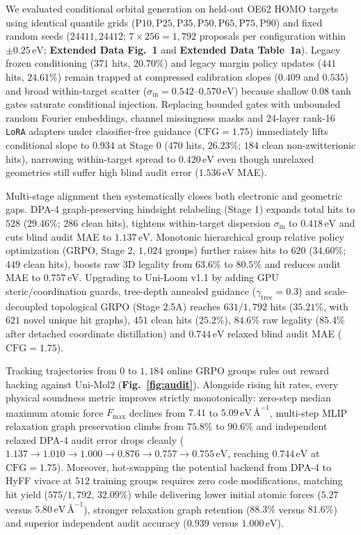\documentclass[11pt,a4paper]{article}
\begin{document}
We evaluated conditional orbital generation on held-out OE62 HOMO targets using identical quantile grids ($\text{P10},\text{P25},\text{P35},\text{P50},\text{P65},\text{P75},\text{P90}$) and fixed random seeds ($24411, 24412$; $7\times 256 = 1{,}792$ proposals per configuration within $\pm 0.25\,\text{eV}$; \textbf{Extended Data Fig.~1} and \textbf{Extended Data Table~1a}). Legacy frozen conditioning ($371$ hits, $20.70\%$) and legacy margin policy updates ($441$ hits, $24.61\%$) remain trapped at compressed calibration slopes ($0.409$ and $0.535$) and broad within-target scatter ($\sigma_{\text{in}}=0.542$--$0.570\,\text{eV}$) because shallow $0.08\tanh$ gates saturate conditional injection. Replacing bounded gates with unbounded random Fourier embeddings, channel missingness masks and 24-layer rank-16 \texttt{LoRA} adapters\cite{hu2022lora} under classifier-free guidance\cite{ho2022cfg} ($\text{CFG}=1.75$) immediately lifts conditional slope to $0.934$ at Stage 0 ($470$ hits, $26.23\%$; $184$ clean non-zwitterionic hits), narrowing within-target spread to $0.420\,\text{eV}$ even though unrelaxed geometries still suffer high blind audit error ($1.536\,\text{eV}$ MAE).

Multi-stage alignment then systematically closes both electronic and geometric gaps. DPA-4 graph-preserving hindsight relabeling (Stage 1) expands total hits to $528$ ($29.46\%$; $286$ clean hits), tightens within-target dispersion $\sigma_{\text{in}}$ to $0.418\,\text{eV}$ and cuts blind audit MAE to $1.137\,\text{eV}$. Monotonic hierarchical group relative policy optimization\cite{shao2024grpo} (GRPO, Stage 2, $1{,}024$ groups) further raises hits to $620$ ($34.60\%$; $449$ clean hits), boosts raw 3D legality from $63.6\%$ to $80.5\%$ and reduces audit MAE to $0.757\,\text{eV}$. Upgrading to Uni-Loom v1.1 by adding GPU steric/coordination guards, tree-depth annealed guidance ($\gamma_{\text{tree}}=0.3$) and scale-decoupled topological GRPO (Stage 2.5A) reaches $631/1{,}792$ hits ($35.21\%$, with $621$ novel unique hit graphs), $451$ clean hits ($25.2\%$), $84.6\%$ raw legality ($85.4\%$ after detached coordinate distillation) and $0.744\,\text{eV}$ relaxed blind audit MAE ($\text{CFG}=1.75$).

Tracking trajectories from $0$ to $1{,}184$ online GRPO groups rules out reward hacking against Uni-Mol2 (\textbf{Fig.~\ref{fig:audit}}). Alongside rising hit rates, every physical soundness metric improves strictly monotonically: zero-step median maximum atomic force $F_{\max}$ declines from $7.41$ to $5.09\,\text{eV}\,\text{\AA}^{-1}$, multi-step MLIP relaxation graph preservation climbs from $75.8\%$ to $90.6\%$ and independent relaxed DPA-4 audit error drops cleanly ($1.137 \to 1.010 \to 1.000 \to 0.876 \to 0.757 \to 0.755\,\text{eV}$, reaching $0.744\,\text{eV}$ at $\text{CFG}=1.75$). Moreover, hot-swapping the potential backend from DPA-4\cite{deepmodeling2026dpa4} to HyFF vivace\cite{hyra2026hyff} at $512$ training groups requires zero code modifications, matching hit yield ($575/1{,}792$, $32.09\%$) while delivering lower initial atomic forces ($5.27$ versus $5.80\,\text{eV}\,\text{\AA}^{-1}$), stronger relaxation graph retention ($88.3\%$ versus $81.6\%$) and superior independent audit accuracy ($0.939$ versus $1.000\,\text{eV}$).
\end{document}
